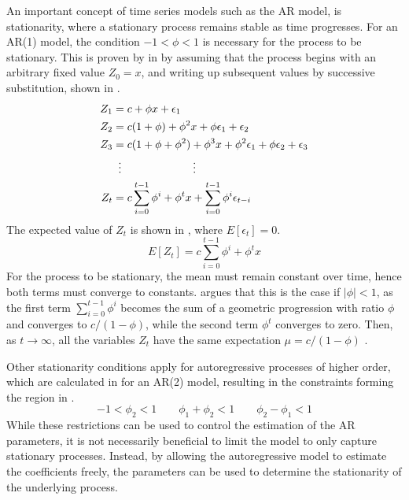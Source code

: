     An important concept of time series models such as the AR model, is stationarity, where a stationary process remains stable as time progresses. For an AR(1) model, the condition $-1<\phi<1$ is necessary for the process to be stationary. This is proven by \citeauthor{alonso2012autoregressive} in \cite{alonso2012autoregressive} by assuming that the process begins with an arbitrary fixed value $Z_0=x$, and writing up subsequent values by successive substitution, shown in .
    \begin{equation}\label{eq:ar-substitution}
        \begin{split}
            Z_1 & = c + \phi x + \epsilon_1 \\
            Z_2 & = c(1+\phi) + \phi^2x+\phi\epsilon_1 + \epsilon_2 \\
            Z_3 & = c(1+\phi+\phi^2) + \phi^3x + \phi^2\epsilon_1 + \phi\epsilon_2 + \epsilon_3 \\
            & \vdotswithin{=}\qquad\qquad\qquad \vdots \\
            Z_t & = c\sum_{i=0}^{t-1}\phi^i + \phi^tx + \sum_{i=0}^{t-1}\phi^i\epsilon_{t-i}
        \end{split}
    \end{equation}
    The expected value of $Z_t$ is shown in , where $E[\epsilon_t]=0$.
    \begin{equation}\label{eq:ar-expectation}
        E[Z_t] = c\sum_{i=0}^{t-1}\phi^i+\phi^tx
    \end{equation}
    For the process to be stationary, the mean must remain constant over time, hence both terms must converge to constants. \citeauthor{alonso2012autoregressive} argues that this is the case if $|\phi|<1$, as the first term $\sum_{i=0}^{t-1}\phi^i$ becomes the sum of a geometric progression with ratio $\phi$ and converges to $c/(1-\phi)$, while the second term $\phi^t$ converges to zero. Then, as $t\rightarrow\infty$, all the variables $Z_t$ have the same expectation $\mu=c/(1-\phi)$ \cite{alonso2012autoregressive}.
    
    Other stationarity conditions apply for autoregressive processes of higher order, which are calculated in \cite{giles2012stationarity} for an AR(2) model, resulting in the constraints forming the region in .
    \begin{equation}\label{eq:ar-2-constraints}
        -1<\phi_2<1 \qquad \phi_1+\phi_2<1 \qquad \phi_2-\phi_1<1
    \end{equation}
    While these restrictions can be used to control the estimation of the AR parameters, it is not necessarily beneficial to limit the model to only capture stationary processes. Instead, by allowing the autoregressive model to estimate the coefficients freely, the parameters can be used to determine the stationarity of the underlying process.
    
